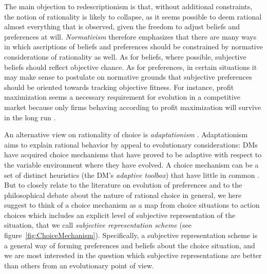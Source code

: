 \documentclass[fleqn,reqno,12pt]{article}
\theoremstyle{Satz}
\theoremstyle{Bsp}
\begin{document}
The main objection to redescriptionism is that, without additional constraints, the notion of
rationality is likely to collapse, as it seems possible to deem rational almost everything that
is observed, given the freedom to adjust beliefs and preferences at will. \emph{Normativism}
therefore emphasizes that there are many ways in which ascriptions of beliefs and preferences
should be constrained by normative considerations of rationality as well. As for beliefs, where
possible, subjective beliefs should reflect objective chance. 
As for preferences, in certain situations it may make sense to
postulate on normative grounds that subjective preferences should be oriented towards tracking
objective fitness. For instance, profit maximization seems a necessary requirement for
evolution in a competitive market because only firms behaving according to profit maximization will survive in the long run \citep[e.g.,][]{alch50,Fried53}.

An alternative view on rationality of choice is \emph{adaptationism}
\citep[e.g.,][]{Anderson1991:Is-human-cognit,ChaterOaksford2000:The-Rational-An,HagenChater2012:Decision-Making}. Adaptationism
aims to explain rational behavior by appeal to evolutionary considerations: DMs have acquired
choice mechanisms that have proved to be adaptive with respect to the variable environment
where they have evolved. A choice mechanism can be a set of distinct heuristics (the DM's
\emph{adaptive toolbox}) that have little in common
\citep[e.g.,][]{TverskyKahnemann1981:The-Framing-of-,GigerenzerGoldstein1996:Reasoning-the-F,ScheibehenneRieskamp2013:Testing-the-Ada}. But
to closely relate to the literature on evolution of preferences and to the philosophical debate
about the nature of rational choice in general, we here suggest to think of a choice mechanism
as a map from choice situations to action choices which includes an explicit level of
subjective representation of the situation, that we call \emph{subjective representation
  scheme} (see figure~\ref{fig:ChoiceMechanism}). Specifically, a subjective representation
scheme is a general way of forming preferences and beliefs about the choice situation, and we
are most interested in the question which subjective representations are better than others
from an evolutionary point of view.
\end{document}
